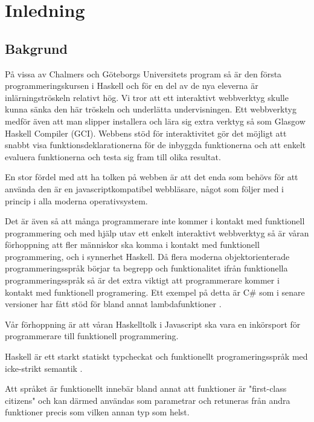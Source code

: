 ﻿\section{Inledning}

\subsection{Bakgrund}
På vissa av Chalmers och Göteborgs Universitets program så är den första programmeringskursen i Haskell \citep{haskell98} och för en del av de nya eleverna är inlärningströskeln relativt hög. Vi tror att ett interaktivt webbverktyg skulle kunna sänka den här tröskeln och underlätta undervisningen. Ett webbverktyg medför även att man slipper installera och lära sig extra verktyg så som Glasgow Haskell Compiler (GCI). Webbens stöd för interaktivitet gör det möjligt att snabbt visa funktionsdeklarationerna för de inbyggda funktionerna och att enkelt evaluera funktionerna och testa sig fram till olika resultat. 

En stor fördel med att ha tolken på webben är att det enda som behövs för att använda den är en javascriptkompatibel webbläsare, något som följer med i princip i alla moderna operativsystem.

Det är även så att många programmerare inte kommer i kontakt med funktionell programmering  och med hjälp utav ett enkelt interaktivt webbverktyg så är våran förhoppning att fler människor ska komma i kontakt med funktionell programmering, och i synnerhet Haskell. Då flera moderna objektorienterade programmeringsspråk börjar ta begrepp och funktionalitet ifrån funktionella programmeringsspråk så är det extra viktigt att programmerare kommer i kontakt med funktionell programering. Ett exempel på detta är C\# som i senare versioner har fått stöd för bland annat lambdafunktioner \citep{csharp}. 

Vår förhoppning är att våran Haskelltolk i Javascript ska vara en inkörsport för programmerare till funktionell programmering.

Haskell är ett starkt statiskt typcheckat och funktionellt programeringsspråk med icke-strikt semantik . 

Att språket är funktionellt innebär bland annat att funktioner är "first-class citizens" och kan därmed användas som parametrar och retuneras från andra funktioner precis som vilken annan typ som helst.


